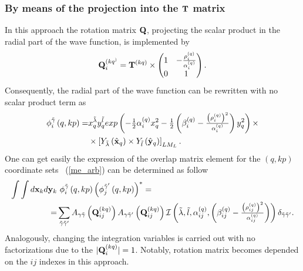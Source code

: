\documentclass[12pt,a4paper,twoside]{article}
\begin{document}
\subsubsection{By means of the projection into the ${\bf T}$ matrix}
\label{overlap_by_proj}
In this approach the rotation matrix ${\bf Q}$, projecting the scalar product in the radial part of the wave function, is implemented by
\begin{equation}
{\bf Q}_i^{(kq^)}= {\bf T}^{(kq)} \times
\begin{pmatrix}
1 & -\tfrac{\rho^{(q)}_{i}}{\alpha^{(q)}_i} \\ 
0 & 1
\end{pmatrix} .
\end{equation}
Consequently, the radial part of the wave function can be rewritten with no scalar product term as
\begin{align}
\phi_{i}^{\tilde{\gamma} } \left(q, kp \right)  =  &
 x_{q}^{\tilde{\lambda}} y_{q}^{\tilde{l}} exp\left(- \tfrac{1}{2} \alpha^{(q)}_{i} x_{q}^{2} - \tfrac{1}{2} \left(  \beta^{(q)}_{i} - \tfrac{\left(\rho^{(q)}_i\right)^2}{\alpha^{(q)}_i} \right)  y_{q}^{2}  \right) 
\times  \nonumber \\ 
&\times  \left[ Y_{\tilde{\lambda}} \left(  \hat{ \bf x}_q \right) \times Y_{\tilde{l}} \left( \hat{\bf y}_q \right) \right]_{LM_L}.
\end{align}
One can get easily the expression of the overlap matrix element for the $(q,kp)$ coordinate sets ~(\ref{me_arb}) can be determined as follow
\begin{align}
\int \int d{\bf x}_k d{\bf y}_k & ~\phi_{i}^{\tilde{\gamma}}\left(q,kp \right) \left( \phi_{j}^{\tilde{\gamma}^{\prime}}\left(q,kp \right) \right)^{*} =  \nonumber \\
=& \sum_{\tilde{\gamma}\tilde{\gamma}^{\prime}}  
A_{\gamma\tilde{\gamma}}\left( {\bf Q}_{ij}^{(kq)} \right)
 A_{\gamma\tilde{\gamma}^{\prime}}\left( {\bf Q}_{ij}^{(kq)} \right) \mathcal{I} \left( \tilde{\lambda}, \tilde{l}, \alpha^{(q)}_{ij}, \left(  \beta^{(q)}_{ij} - \tfrac{\left(\rho^{(q)}_{ij}\right)^2}{\alpha^{(q)}_{ij}} \right) \right) \delta_{\tilde{\gamma}\tilde{\gamma}^{\prime}}.
 \label{projectionMethod}
\end{align}
Analogously, changing the integration variables is carried out with no factorizations due to the $\vert {\bf Q}_i^{(kq)} \vert = 1$. Notably,   rotation matrix becomes depended on the $ij$ indexes in this approach.
\end{document}
